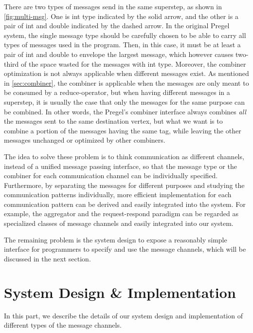 \documentclass{sokendai_thesis} %
\begin{document}
There are two types of messages send in the same superstep, as shown in \autoref{fig:multi-msg}.
One is int type indicated by the solid arrow, and the other is a pair of int and double indicated by the dashed arrow.
In the original Pregel system, the single message type should be carefully chosen to be able to carry all types of messages used in the program.
Then, in this case, it must be at least a pair of int and double to envelope the largest message, which however causes two-third of the space wasted for the messages with int type.
Moreover, the combiner optimization is not always applicable when different messages exist.
As mentioned in \autoref{sec:combiner}, the combiner is applicable when the messages are only meant to be consumed by a reduce-operator,
but when having different messages in a superstep, it is usually the case that only the messages for the same purpose can be combined.
In other words, the Pregel's combiner interface always combines \emph{all} the messages sent to the same destination vertex, but what we want is to combine a portion of the messages having the same tag, while leaving the other messages unchanged or optimized by other combiners.

The idea to solve these problem is to think communication as different channels, instead of a unified message passing interface, so that the message type or the combiner for each communication channel can be individually specified.
Furthermore, by separating the messages for different purposes and studying the communication patterns individually, more efficient implementation for each communication pattern can be derived and easily integrated into the system.
For example, the aggregator and the request-respond paradigm \cite{effective} can be regarded as specialized classes of message channels and easily integrated into our system.

The remaining problem is the system design to expose a reasonably simple interface for programmers to specify and use the message channels, which will be discussed in the next section.

\section{System Design \& Implementation}

In this part, we describe the details of our system design and implementation of different types of the message channels.

\end{document}
